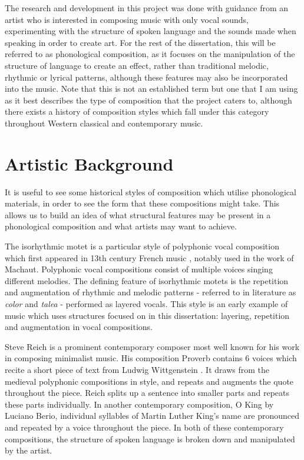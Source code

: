 \documentclass[12pt,a4paper,oneside,openright]{report}
\begin{document}
 The research and development in this project was done with guidance from an artist who is interested in composing music with only vocal sounds, experimenting with the structure of spoken language and the sounds made when speaking in order to create art. For the rest of the dissertation, this will be referred to as phonological composition, as it focuses on the manipulation of the structure of language to create an effect, rather than traditional melodic, rhythmic or lyrical patterns, although these features may also be incorporated into the music. Note that this is not an established term but one that I am using as it best describes the type of composition that the project caters to, although there exists a history of composition styles which fall under this category throughout Western classical and contemporary music.

\section{Artistic Background}\label{sec:art_background}
It is useful to see some historical styles of composition which utilise phonological materials, in order to see the form that these compositions might take. This allows us to build an idea of what structural features may be present in a phonological composition and what artists may want to achieve.

The isorhythmic motet is a particular style of polyphonic vocal composition which first appeared in 13th century French music \cite{Bent01}, notably used in the work of Machaut. Polyphonic vocal compositions consist of multiple voices singing different melodies. The defining feature of isorhythmic motets is the repetition and augmentation of rhythmic and melodic patterns - referred to in literature as \textit{color} and \textit{talea} - performed as layered vocals. This style is an early example of music which uses structures focused on in this dissertation: layering, repetition and augmentation in vocal compositions.

Steve Reich is a prominent contemporary composer most well known for his work in composing minimalist music. His composition Proverb contains 6 voices which recite a short piece of text from Ludwig Wittgenstein \cite{ReichProverb}. It draws from the medieval polyphonic compositions in style, and repeats and augments the quote throughout the piece. Reich splits up a sentence into smaller parts and repeats these parts individually. In another contemporary composition, O King by Luciano Berio, individual syllables of Martin Luther King's name are pronounced and repeated by a voice throughout the piece. In both of these contemporary compositions, the structure of spoken language is broken down and manipulated by the artist.
\end{document}
